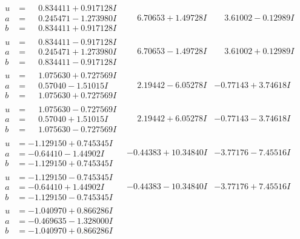 \documentclass[1p]{elsarticle_modified}
\theoremstyle{definition}
\begin{document}
$$\begin{array}{c|c|c}
\begin{aligned}
u &= \phantom{-}0.834411 + 0.917128 I \\
a &= \phantom{-}0.245471 - 1.273980 I \\
b &= \phantom{-}0.834411 + 0.917128 I\end{aligned}
 & \phantom{-}6.70653 + 1.49728 I & \phantom{-}3.61002 - 0.12989 I \\ \hline\begin{aligned}
u &= \phantom{-}0.834411 - 0.917128 I \\
a &= \phantom{-}0.245471 + 1.273980 I \\
b &= \phantom{-}0.834411 - 0.917128 I\end{aligned}
 & \phantom{-}6.70653 - 1.49728 I & \phantom{-}3.61002 + 0.12989 I \\ \hline\begin{aligned}
u &= \phantom{-}1.075630 + 0.727569 I \\
a &= \phantom{-}0.57040 - 1.51015 I \\
b &= \phantom{-}1.075630 + 0.727569 I\end{aligned}
 & \phantom{-}2.19442 - 6.05278 I & -0.77143 + 3.74618 I \\ \hline\begin{aligned}
u &= \phantom{-}1.075630 - 0.727569 I \\
a &= \phantom{-}0.57040 + 1.51015 I \\
b &= \phantom{-}1.075630 - 0.727569 I\end{aligned}
 & \phantom{-}2.19442 + 6.05278 I & -0.77143 - 3.74618 I \\ \hline\begin{aligned}
u &= -1.129150 + 0.745345 I \\
a &= -0.64410 - 1.44902 I \\
b &= -1.129150 + 0.745345 I\end{aligned}
 & -0.44383 + 10.34840 I & -3.77176 - 7.45516 I \\ \hline\begin{aligned}
u &= -1.129150 - 0.745345 I \\
a &= -0.64410 + 1.44902 I \\
b &= -1.129150 - 0.745345 I\end{aligned}
 & -0.44383 - 10.34840 I & -3.77176 + 7.45516 I \\ \hline\begin{aligned}
u &= -1.040970 + 0.866286 I \\
a &= -0.469635 - 1.328000 I \\
b &= -1.040970 + 0.866286 I\end{aligned}

\end{array}$$
\end{document}
